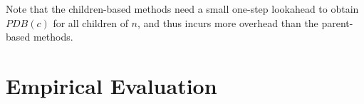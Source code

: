 \documentclass[letterpaper]{article}
\newtheorem{example}{Example}
\begin{document}
Note that the children-based methods need a small one-step lookahead to obtain $PDB(c)$ for all children of $n$, and thus incurs more overhead than the parent-based methods. 






%



\section{Empirical Evaluation}
\end{document}
